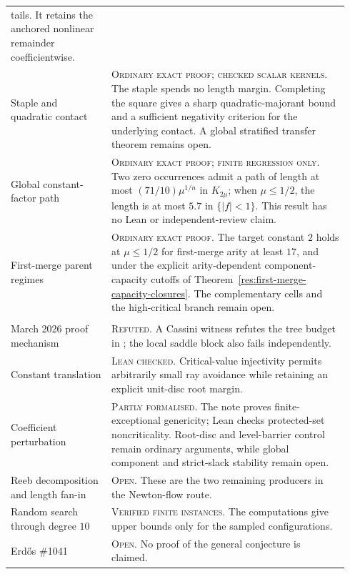 \documentclass[11pt]{article}
\begin{document}
{\begin{longtable}{@{}
  >{\raggedright\arraybackslash}p{0.28\linewidth}
  >{\raggedright\arraybackslash}p{0.66\linewidth}@{}}
tails.  It retains the anchored nonlinear remainder coefficientwise. \\
\addlinespace
Staple and quadratic contact &
\textsc{Ordinary exact proof; checked scalar kernels.}  The staple spends no
length margin.  Completing the square gives a sharp quadratic-majorant bound
and a sufficient negativity criterion for the underlying contact.  A global
stratified transfer theorem remains open. \\
\addlinespace
Global constant-factor path &
\textsc{Ordinary exact proof; finite regression only.}  Two zero occurrences
admit a path of length at most $(71/10)\mu^{1/n}$ in $K_{2\mu}$; when
$\mu\le1/2$, the length is at most $5.7$ in $\{|f|<1\}$.  This result has no
Lean or independent-review claim. \\
\addlinespace
First-merge parent regimes &
\textsc{Ordinary exact proof.}  The target constant $2$ holds at
$\mu\le1/2$ for first-merge arity at least $17$, and under the explicit
arity-dependent component-capacity cutoffs of
Theorem~\ref{res:first-merge-capacity-closures}.  The complementary cells and
the high-critical branch remain open. \\
\midrule
\multicolumn{2}{@{}p{0.94\linewidth}@{}}{\textbf{Genericity, failed mechanisms, and open steps}} \\
\addlinespace
March 2026 proof mechanism &
\textsc{Refuted.}  A Cassini witness refutes the tree budget in
\cite[Prop.~12]{march2026}; the local saddle block also fails independently. \\
\addlinespace
Constant translation &
\textsc{Lean checked.}  Critical-value injectivity permits arbitrarily small
ray avoidance while retaining an explicit unit-disc root margin. \\
\addlinespace
Coefficient perturbation &
\textsc{Partly formalised.}  The note proves finite-exceptional genericity;
Lean checks protected-set noncriticality.  Root-disc and level-barrier control
remain ordinary arguments, while global component and strict-slack stability
remain open. \\
\addlinespace
Reeb decomposition and length fan-in &
\textsc{Open.}  These are the two remaining producers in the Newton-flow
route. \\
\addlinespace
Random search through degree $10$ &
\textsc{Verified finite instances.}  The computations give upper bounds only
for the sampled configurations. \\
\addlinespace
Erd\H{o}s \#1041 &
\textsc{Open.}  No proof of the general conjecture is claimed. \\
\end{longtable}}
\end{document}
